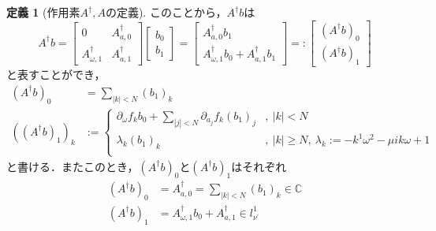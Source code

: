 \documentclass[11pt,a4paper]{jsarticle}
\theoremstyle{definition}
\newtheorem{dfn}{定義}
\begin{document}
\begin{dfn}[作用素$A^\dagger,A$の定義]
  このことから，$A^\dagger b$は
  \begin{equation*}
    A^\dagger b = \begin{bmatrix}
      0                    & A^\dagger_{a,0} \\
      A^\dagger_{\omega,1} & A^\dagger_{a,1}
    \end{bmatrix}
    \begin{bmatrix}
      b_0 \\
      b_1
    \end{bmatrix}
    = \begin{bmatrix}
      A_{a,0}^\dagger b_1 \\
      A_{\omega,1}^\dagger b_0 + A_{a,1}^\dagger b_1
    \end{bmatrix}
    =: \begin{bmatrix}
      \left(A^\dagger b\right)_0 \\
      \left(A^\dagger b\right)_1
    \end{bmatrix}
  \end{equation*}
  と表すことができ，
  \begin{align*}
    \left(A^\dagger b\right)_0                & = \sum_{|k|<N} (b_1)_k                                                                                                             \\
    \left(\left(A^\dagger b\right)_1\right)_k & := \begin{cases}
                                                     \partial_\omega f_k b_0 + \sum_{|j|<N} \partial_{a_j} f_k (b_1)_j & ,\ |k|<N                                                    \\
                                                     \lambda_k (b_1)_k                                                 & ,\ |k|\geq N,\ \lambda_k := -k^1\omega^2 - \mu ik\omega + 1 \\
                                                   \end{cases}
  \end{align*}
  と書ける．またこのとき，$(A^\dagger b)_0$と$(A^\dagger b)_1$はそれぞれ
  \begin{align*}
    \left(A^\dagger b\right)_0 & = A_{a,0}^\dagger = \sum_{|k|<N} (b_1)_k \in \mathbb{C}           \\
    \left(A^\dagger b\right)_1 & = A_{\omega,1}^\dagger b_0 + A_{a,1}^\dagger \in l_{\nu^\prime}^1
  \end{align*}


\end{dfn}
\end{document}
